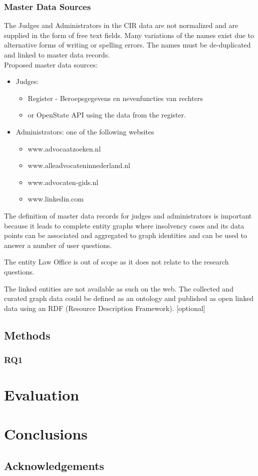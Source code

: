 \subsubsection{Master Data Sources}
The Judges and Administrators in the CIR data are not normalized and are supplied in the form of free text fields. Many variations of the names exist due to alternative forms of writing or spelling errors. The names must be de-duplicated and linked to master data records.
\\
Proposed master data sources:
\begin{itemize}
	\item Judges: 
	\begin{itemize}
		\item Register - Beroepsgegevens en nevenfuncties van rechters
		\item or OpenState API using the data from the register.
	\end{itemize}
	\item Administrators: one of the following websites
	\begin{itemize}
		\item www.advocaatzoeken.nl
		\item www.alleadvocateninnederland.nl
		\item www.advocaten-gids.nl
		\item www.linkedin.com
	\end{itemize}
\end{itemize}

The definition of master data records for judges and administrators is important because it leads to complete entity graphs where insolvency cases and its data points can be associated and aggregated to graph identities and can be used to answer a number of user questions.

The entity Law Office is out of scope as it does not relate to the research questions.

The linked entities are not available as such on the web. The collected and curated graph data could be defined as an ontology and published as open linked data using an RDF (Resource Description Framework). [optional]


\subsection{Methods}
\subsubsection{RQ1}
\section{Evaluation}
\section{Conclusions}
\subsection{Acknowledgements}

